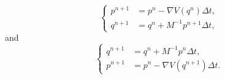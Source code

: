     \begin{equation}\label{eq:symplectic_euler_A}
    \left\{\begin{aligned}
         p^{n+1} &=p^n -\nabla V(q^n)\Delta t,\\
         q^{n+1} &=q^n + M^{-1}p^{n+1}\Delta t,
    \end{aligned}\right.
    \end{equation}
    and
    \begin{equation}\label{eq:symplectic_euler_B}
        \left\{\begin{aligned}
             q^{n+1} &=q^n +M^{-1}p^n\Delta t,\\
             p^{n+1} &=p^n - \nabla V(q^{n+1})\Delta t.
        \end{aligned}\right.
    \end{equation}

